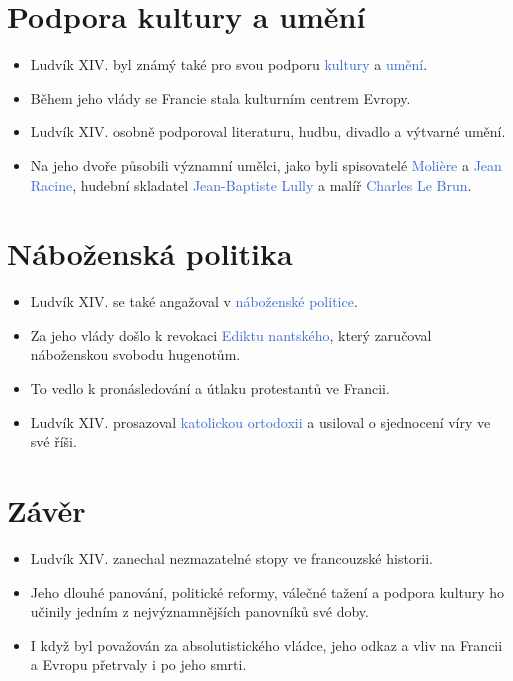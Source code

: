 \documentclass{article}
\begin{document}
\section{Podpora kultury a umění}
\begin{itemize}[label=$\bullet$,itemsep=2pt]
\item Ludvík XIV. byl známý také pro svou podporu \textcolor{highlight}{kultury} a \textcolor{highlight}{umění}.
\item Během jeho vlády se Francie stala kulturním centrem Evropy.
\item Ludvík XIV. osobně podporoval literaturu, hudbu, divadlo a výtvarné umění.
\item Na jeho dvoře působili významní umělci, jako byli spisovatelé \textcolor{highlight}{Molière} a \textcolor{highlight}{Jean Racine}, hudební skladatel \textcolor{highlight}{Jean-Baptiste Lully} a malíř \textcolor{highlight}{Charles Le Brun}.
\end{itemize}

\section{Náboženská politika}
\begin{itemize}[label=$\bullet$,itemsep=2pt]
\item Ludvík XIV. se také angažoval v \textcolor{highlight}{náboženské politice}.
\item Za jeho vlády došlo k revokaci \textcolor{highlight}{Ediktu nantského}, který zaručoval náboženskou svobodu hugenotům.
\item To vedlo k pronásledování a útlaku protestantů ve Francii.
\item Ludvík XIV. prosazoval \textcolor{highlight}{katolickou ortodoxii} a usiloval o sjednocení víry ve své říši.
\end{itemize}

\section{Závěr}
\begin{itemize}[label=$\bullet$,itemsep=2pt]
\item Ludvík XIV. zanechal nezmazatelné stopy ve francouzské historii.
\item Jeho dlouhé panování, politické reformy, válečné tažení a podpora kultury ho učinily jedním z nejvýznamnějších panovníků své doby.
\item I když byl považován za absolutistického vládce, jeho odkaz a vliv na Francii a Evropu přetrvaly i po jeho smrti.
\end{itemize}
\end{document}
